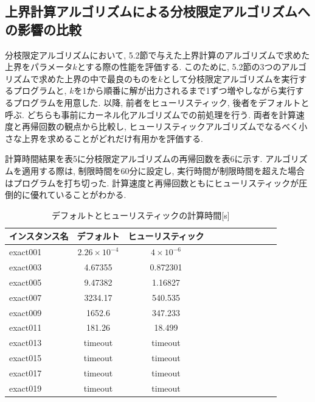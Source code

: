 \documentclass[10.5,a4paper,titlepage, dvipdfmx]{bxjsarticle}
\begin{document}
\subsection{上界計算アルゴリズムによる分枝限定アルゴリズムへの影響の比較}
分枝限定アルゴリズムにおいて, 5.2節で与えた上界計算のアルゴリズムで求めた上界をパラメータ$k$とする際の性能を評価する.
このために, 5.2節の3つのアルゴリズムで求めた上界の中で最良のものを$k$として分枝限定アルゴリズムを実行するプログラムと, $k$を1から順番に解が出力されるまで1ずつ増やしながら実行するプログラムを用意した.
以降, 前者をヒューリスティック, 後者をデフォルトと呼ぶ.
どちらも事前にカーネル化アルゴリズムでの前処理を行う.
両者を計算速度と再帰回数の観点から比較し, ヒューリスティックアルゴリズムでなるべく小さな上界を求めることがどれだけ有用かを評価する.\par
計算時間結果を表5に分枝限定アルゴリズムの再帰回数を表6に示す.
アルゴリズムを適用する際は, 制限時間を60分に設定し, 実行時間が制限時間を超えた場合はプログラムを打ち切った.
計算速度と再帰回数ともにヒューリスティックが圧倒的に優れていることがわかる.

\begin{table}[H]
    \caption{デフォルトとヒューリスティックの計算時間[s]}
    \label{table:data_type}
    \centering
    \begin{tabular}{l|cccccccccr}
        \hline
        インスタンス名  & デフォルト  &  ヒューリスティック\\
        \hline
        exact001  & $2.26 \times 10^{-4}$  & $4 \times 10^{-6}$\\
        exact003 & 4.67355 & 0.872301\\
        exact005 & 9.47382 & 1.16827\\
        exact007 & 3234.17 & 540.535\\
        exact009 & 1652.6 & 347.233\\
        exact011 & 181.26 & 18.499\\
        exact013 & timeout & timeout\\
        exact015 & timeout & timeout\\
        exact017 & timeout & timeout\\
        exact019 & timeout & timeout\\
        \hline
    \end{tabular}
\end{table}
\end{document}
